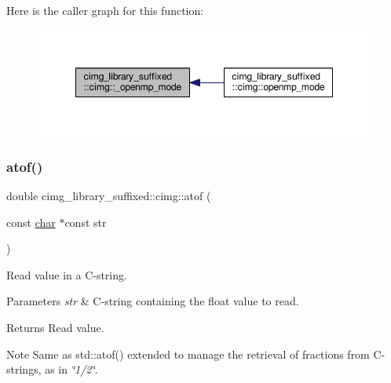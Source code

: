 Here is the caller graph for this function\+:
\nopagebreak
\begin{figure}[H]
\begin{center}
\leavevmode
\includegraphics[width=348pt]{d4/d9b/namespacecimg__library__suffixed_1_1cimg_a2a1f404b2580ad14629ca49e7c5380e5_icgraph}
\end{center}
\end{figure}
\mbox{\label{namespacecimg__library__suffixed_1_1cimg_a00aba235049bc02e53453cbb829469ce}} 
\subsubsection{\texorpdfstring{atof()}{atof()}}
{\footnotesize\ttfamily double cimg\+\_\+library\+\_\+suffixed\+::cimg\+::atof (\begin{DoxyParamCaption}\item[{const \hyperlink{classchar}{char} $\ast$const}]{str }\end{DoxyParamCaption})\hspace{0.3cm}{\ttfamily [inline]}}



Read value in a C-\/string. 


\begin{DoxyParams}{Parameters}
{\em str} & C-\/string containing the float value to read. \\
\hline
\end{DoxyParams}
\begin{DoxyReturn}{Returns}
Read value. 
\end{DoxyReturn}
\begin{DoxyNote}{Note}
Same as {\ttfamily std\+::atof()} extended to manage the retrieval of fractions from C-\/strings, as in {\itshape \char`\"{}1/2\char`\"{}}. 
\end{DoxyNote}


